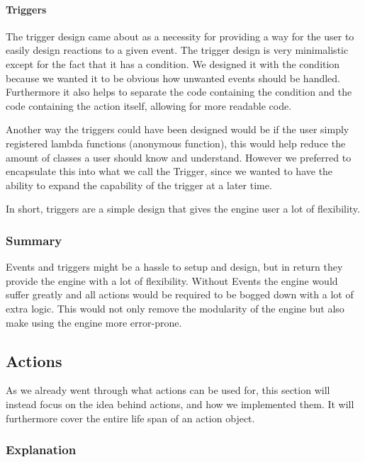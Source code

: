\paragraph*{Triggers}

The trigger design came about as a necessity for providing a way for
the user to easily design reactions to a given event. The trigger
design is very minimalistic except for the fact that it has a condition.
We designed it with the condition because we wanted it to be obvious
how unwanted events should be handled. Furthermore it also helps to
separate the code containing the condition and the code containing
the action itself, allowing for more readable code. 

Another way the triggers could have been designed would be if the
user simply registered lambda functions (anonymous function), this
would help reduce the amount of classes a user should know and understand.
However we preferred to encapsulate this into what we call the Trigger,
since we wanted to have the ability to expand the capability of the
trigger at a later time.

In short, triggers are a simple design that gives the engine user
a lot of flexibility. 


\subsubsection*{Summary}

Events and triggers might be a hassle to setup and design, but in
return they provide the engine with a lot of flexibility. Without
Events the engine would suffer greatly and all actions would be required
to be bogged down with a lot of extra logic. This would not only remove
the modularity of the engine but also make using the engine more error-prone.


\subsection{Actions}

As we already went through what actions can be used for, this section
will instead focus on the idea behind actions, and how we implemented
them. It will furthermore cover the entire life span of an action
object.


\subsubsection*{Explanation}

